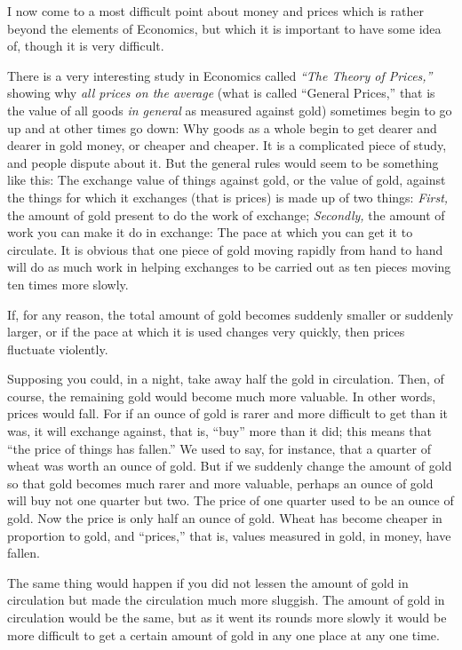 \documentclass{book}
\begin{document}
I now come to a most difficult point about money and prices which is rather beyond the elements of Economics, but which it is important to have some idea of, though it is very difficult.

There is a very interesting study in Economics called \emph{“The Theory of Prices,”} showing why \emph{all prices on the average} (what is called “General Prices,” that is the value of all goods \emph{in general} as measured against gold) sometimes begin to go up and at other times go down: Why goods as a whole begin to get dearer and dearer in gold money, or cheaper and cheaper. It is a complicated piece of study, and people dispute about it. But the general rules would seem to be something like this: The exchange value of things against gold, or the value of gold, against the things for which it exchanges (that is prices) is made up of two things: \emph{First,} the amount of gold present to do the work of exchange; \emph{Secondly,} the amount of work you can make it do in exchange: The pace at which you can get it to circulate. It is obvious that one piece of gold moving rapidly from hand to hand will do as much work in helping exchanges to be carried out as ten pieces moving ten times more slowly.

If, for any reason, the total amount of gold becomes suddenly smaller or suddenly larger, or if the pace at which it is used changes very quickly, then prices fluctuate violently.

Supposing you could, in a night, take away half the gold in circulation. Then, of course, the remaining gold would become much more valuable. In other words, prices would fall. For if an ounce of gold is rarer and more difficult to get than it was, it will exchange against, that is, “buy” more than it did; this means that “the price of things has fallen.” We used to say, for instance, that a quarter of wheat was worth an ounce of gold. But if we suddenly change the amount of gold so that gold becomes much rarer and more valuable, perhaps an ounce of gold will buy not one quarter but two. The price of one quarter used to be an ounce of gold. Now the price is only half an ounce of gold. Wheat has become cheaper in proportion to gold, and “prices,” that is, values measured in gold, in money, have fallen.

The same thing would happen if you did not lessen the amount of gold in circulation but made the circulation much more sluggish. The amount of gold in circulation would be the same, but as it went its rounds more slowly it would be more difficult to get a certain amount of gold in any one place at any one time.
\end{document}
